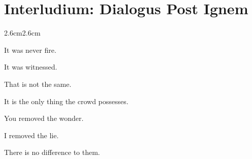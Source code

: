 
\chapter*{Interludium: Dialogus Post Ignem}


\begin{adjustwidth}{2.6cm}{2.6cm}

 It was never fire.

 It was witnessed.

 That is not the same.

 It is the only thing the crowd possesses.

\vspace{1em}



\vspace{1em}

 You removed the wonder.

 I removed the lie.

 There is no difference to them.

\vspace{2em}

\end{adjustwidth}

